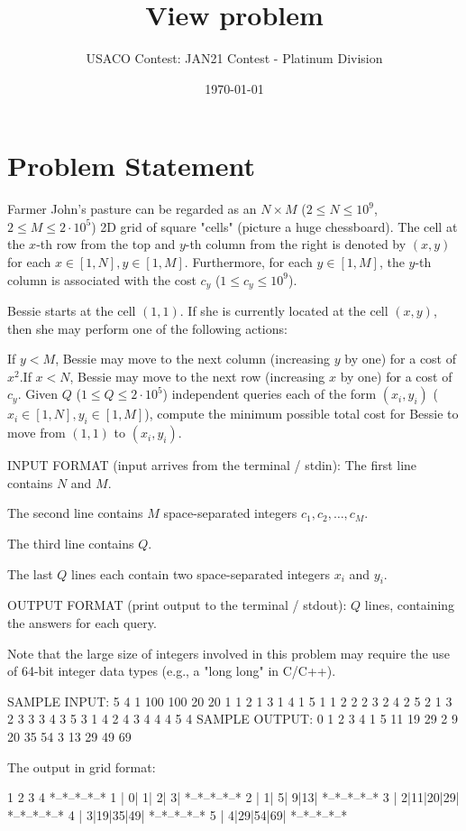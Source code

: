 \documentclass[12pt]{article}
\title{View problem}
\author{USACO Contest: JAN21 Contest - Platinum Division}
\date{\today}
\begin{document}
\maketitle

\section*{Problem Statement}

Farmer John's pasture can be regarded as an $N\times M$ ($2\le N\le 10^9$,
$2\le M\le 2\cdot 10^5$) 2D grid of square "cells" (picture a huge chessboard).
The cell at the $x$-th row from the top and $y$-th column from the right is
denoted by $(x,y)$ for each $x\in [1,N], y\in [1,M]$. Furthermore, for each
$y\in [1,M]$, the $y$-th column is associated with the cost $c_y$
($1\le c_y\le 10^9$).

Bessie starts at the cell $(1,1)$. If she is currently located at the cell
$(x,y)$, then she may perform one of the following actions:

If $y<M$, Bessie may move to the next column (increasing $y$ by one) for a
cost of $x^2$.If $x<N$, Bessie may move to the next row (increasing $x$ by one) for a cost
of
$c_y$.
Given $Q$ ($1\le Q\le 2\cdot 10^5$) independent queries each of the form
$(x_i,y_i)$ ($x_i\in [1,N], y_i\in [1,M]$), compute the minimum possible total
cost for Bessie to move from $(1,1)$ to $(x_i,y_i)$.

INPUT FORMAT (input arrives from the terminal / stdin):
The first line contains $N$ and $M$.

The second line contains $M$ space-separated integers $c_1,c_2,\ldots,c_M$.

The third line contains $Q$.

The last $Q$ lines each contain two space-separated integers $x_i$ and $y_i$.

OUTPUT FORMAT (print output to the terminal / stdout):
$Q$ lines, containing the answers for each query.

Note that the large size of integers involved in this problem may require the
use of 64-bit integer data types (e.g., a "long long" in C/C++).

SAMPLE INPUT:
5 4
1 100 100 20
20
1 1
2 1
3 1
4 1
5 1
1 2
2 2
3 2
4 2
5 2
1 3
2 3
3 3
4 3
5 3
1 4
2 4
3 4
4 4
5 4
SAMPLE OUTPUT: 
0
1
2
3
4
1
5
11
19
29
2
9
20
35
54
3
13
29
49
69

The output in grid format:


    1  2  3  4
  *--*--*--*--*
1 | 0| 1| 2| 3|
  *--*--*--*--*
2 | 1| 5| 9|13|
  *--*--*--*--*
3 | 2|11|20|29|
  *--*--*--*--*
4 | 3|19|35|49|
  *--*--*--*--*
5 | 4|29|54|69|
  *--*--*--*--*
\end{document}
